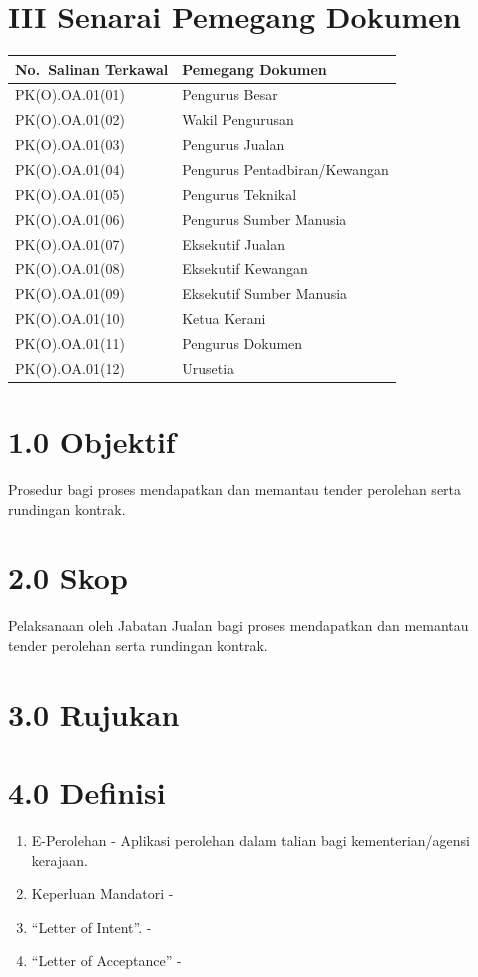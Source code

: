 \documentclass[
]{article}
\begin{document}
\hypertarget{iii-senarai-pemegang-dokumen}{%
\section{III Senarai Pemegang
Dokumen}\label{iii-senarai-pemegang-dokumen}}

\begin{longtable}[]{@{}ll@{}}
\toprule
No.~Salinan Terkawal & Pemegang Dokumen\tabularnewline
\midrule
\endhead
PK(O).OA.01(01) & Pengurus Besar\tabularnewline
PK(O).OA.01(02) & Wakil Pengurusan\tabularnewline
PK(O).OA.01(03) & Pengurus Jualan\tabularnewline
PK(O).OA.01(04) & Pengurus Pentadbiran/Kewangan\tabularnewline
PK(O).OA.01(05) & Pengurus Teknikal\tabularnewline
PK(O).OA.01(06) & Pengurus Sumber Manusia\tabularnewline
PK(O).OA.01(07) & Eksekutif Jualan\tabularnewline
PK(O).OA.01(08) & Eksekutif Kewangan\tabularnewline
PK(O).OA.01(09) & Eksekutif Sumber Manusia\tabularnewline
PK(O).OA.01(10) & Ketua Kerani\tabularnewline
PK(O).OA.01(11) & Pengurus Dokumen\tabularnewline
PK(O).OA.01(12) & Urusetia\tabularnewline
\bottomrule
\end{longtable}

\hypertarget{objektif}{%
\section{1.0 Objektif}\label{objektif}}

Prosedur bagi proses mendapatkan dan memantau tender perolehan serta
rundingan kontrak.

\hypertarget{skop}{%
\section{2.0 Skop}\label{skop}}

Pelaksanaan oleh Jabatan Jualan bagi proses mendapatkan dan memantau
tender perolehan serta rundingan kontrak.

\hypertarget{rujukan}{%
\section{3.0 Rujukan}\label{rujukan}}

\hypertarget{definisi}{%
\section{4.0 Definisi}\label{definisi}}

\begin{enumerate}
\def\labelenumi{\roman{enumi})}
\item
  E-Perolehan - Aplikasi perolehan dalam talian bagi kementerian/agensi
  kerajaan.
\item
  Keperluan Mandatori -
\item
  ``Letter of Intent''. -
\item
  ``Letter of Acceptance'' -
\end{enumerate}
\end{document}
